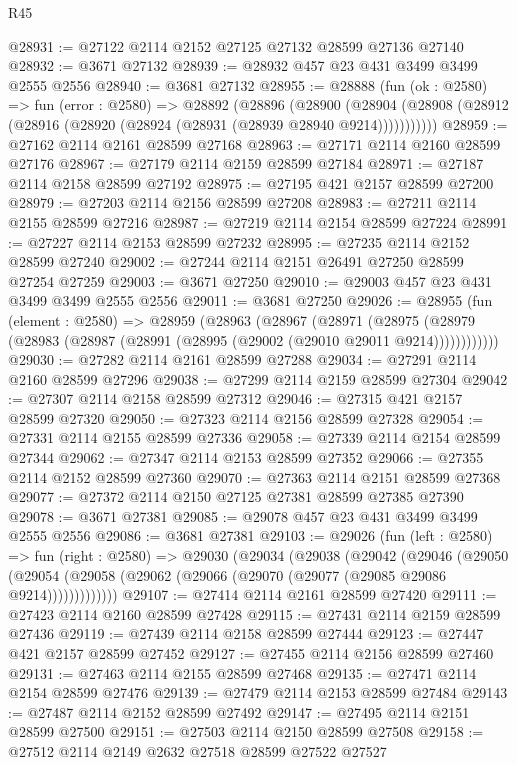 \begin{lexlean}{R45}
\begin{coremodule}
@28931 := @27122 @2114 @2152 @27125 @27132 @28599 @27136 @27140
@28932 := @3671 @27132
@28939 := @28932 @457 @23 @431 @3499 @3499 @2555 @2556
@28940 := @3681 @27132
@28955 := @28888
    (fun (ok : @2580) =>
    fun (error : @2580) =>
    @28892
      (@28896
        (@28900
          (@28904 (@28908 (@28912 (@28916 (@28920 (@28924 (@28931 (@28939 @28940 @9214)))))))))))
@28959 := @27162 @2114 @2161 @28599 @27168
@28963 := @27171 @2114 @2160 @28599 @27176
@28967 := @27179 @2114 @2159 @28599 @27184
@28971 := @27187 @2114 @2158 @28599 @27192
@28975 := @27195 @421 @2157 @28599 @27200
@28979 := @27203 @2114 @2156 @28599 @27208
@28983 := @27211 @2114 @2155 @28599 @27216
@28987 := @27219 @2114 @2154 @28599 @27224
@28991 := @27227 @2114 @2153 @28599 @27232
@28995 := @27235 @2114 @2152 @28599 @27240
@29002 := @27244 @2114 @2151 @26491 @27250 @28599 @27254 @27259
@29003 := @3671 @27250
@29010 := @29003 @457 @23 @431 @3499 @3499 @2555 @2556
@29011 := @3681 @27250
@29026 := @28955
    (fun (element : @2580) =>
    @28959
      (@28963
        (@28967
          (@28971
            (@28975 (@28979 (@28983 (@28987 (@28991 (@28995 (@29002 (@29010 @29011 @9214))))))))))))
@29030 := @27282 @2114 @2161 @28599 @27288
@29034 := @27291 @2114 @2160 @28599 @27296
@29038 := @27299 @2114 @2159 @28599 @27304
@29042 := @27307 @2114 @2158 @28599 @27312
@29046 := @27315 @421 @2157 @28599 @27320
@29050 := @27323 @2114 @2156 @28599 @27328
@29054 := @27331 @2114 @2155 @28599 @27336
@29058 := @27339 @2114 @2154 @28599 @27344
@29062 := @27347 @2114 @2153 @28599 @27352
@29066 := @27355 @2114 @2152 @28599 @27360
@29070 := @27363 @2114 @2151 @28599 @27368
@29077 := @27372 @2114 @2150 @27125 @27381 @28599 @27385 @27390
@29078 := @3671 @27381
@29085 := @29078 @457 @23 @431 @3499 @3499 @2555 @2556
@29086 := @3681 @27381
@29103 := @29026
    (fun (left : @2580) =>
    fun (right : @2580) =>
    @29030
      (@29034
        (@29038
          (@29042
            (@29046
              (@29050
                (@29054 (@29058 (@29062 (@29066 (@29070 (@29077 (@29085 @29086 @9214)))))))))))))
@29107 := @27414 @2114 @2161 @28599 @27420
@29111 := @27423 @2114 @2160 @28599 @27428
@29115 := @27431 @2114 @2159 @28599 @27436
@29119 := @27439 @2114 @2158 @28599 @27444
@29123 := @27447 @421 @2157 @28599 @27452
@29127 := @27455 @2114 @2156 @28599 @27460
@29131 := @27463 @2114 @2155 @28599 @27468
@29135 := @27471 @2114 @2154 @28599 @27476
@29139 := @27479 @2114 @2153 @28599 @27484
@29143 := @27487 @2114 @2152 @28599 @27492
@29147 := @27495 @2114 @2151 @28599 @27500
@29151 := @27503 @2114 @2150 @28599 @27508
@29158 := @27512 @2114 @2149 @2632 @27518 @28599 @27522 @27527

\end{coremodule}
\end{lexlean}
